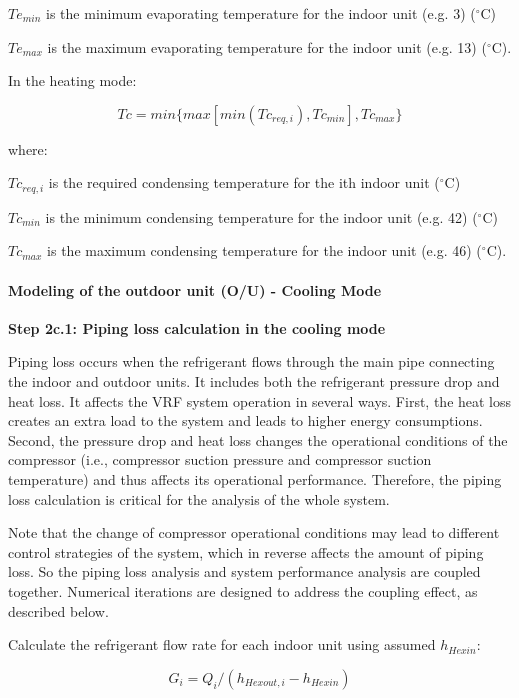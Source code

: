 $Te_{min}$ is the minimum evaporating temperature for the indoor unit (e.g. 3) (\(^{\circ}\)C)

$Te_{max}$ is the maximum evaporating temperature for the indoor unit (e.g. 13) (\(^{\circ}\)C).

In the heating mode:

\begin{equation}
  Tc = min \{ max[min(Tc_{req,i}),Tc_{min}],Tc_{max} \}
\end{equation}

where:

$Tc_{req,i}$ is the required condensing temperature for the ith indoor unit (\(^{\circ}\)C)

$Tc_{min}$ is the minimum condensing temperature for the indoor unit (e.g. 42) (\(^{\circ}\)C)

$Tc_{max}$ is the maximum condensing temperature for the indoor unit (e.g. 46) (\(^{\circ}\)C).

\paragraph{Modeling of the outdoor unit (O/U) - Cooling Mode}\label{modeling-of-the-outdoor-unit-ou-cooling-mode}

\textbf{Step 2c.1: Piping loss calculation in the cooling mode}

Piping loss occurs when the refrigerant flows through the main pipe connecting the indoor and outdoor units. It includes both the refrigerant pressure drop and heat loss. It affects the VRF system operation in several ways. First, the heat loss creates an extra load to the system and leads to higher energy consumptions. Second, the pressure drop and heat loss changes the operational conditions of the compressor (i.e., compressor suction pressure and compressor suction temperature) and thus affects its operational performance. Therefore, the piping loss calculation is critical for the analysis of the whole system.

Note that the change of compressor operational conditions may lead to different control strategies of the system, which in reverse affects the amount of piping loss. So the piping loss analysis and system performance analysis are coupled together. Numerical iterations are designed to address the coupling effect, as described below.

Calculate the refrigerant flow rate for each indoor unit using assumed $h_{Hexin}$:

\begin{equation}
  G_i=Q_i/(h_{Hexout,i}-h_{Hexin})
\end{equation}

